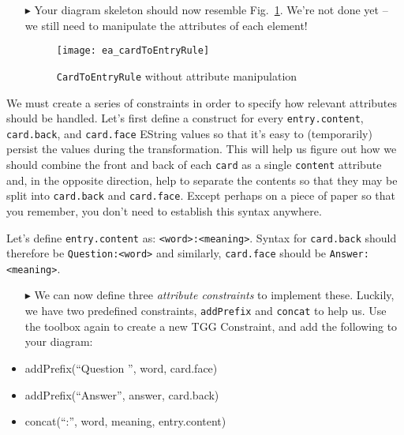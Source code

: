 \begin{enumerate}
\vspace{0.5cm}

\item[$\blacktriangleright$] Your diagram skeleton should now resemble Fig.~\ref{ea:cardtoentry_1}. We're not done yet -- we still need to manipulate the
attributes of each element!

\newpage

  \begin{figure}[htbp]
  \begin{center}
    \texttt{[image: ea\_cardToEntryRule]}
    \caption{\texttt{CardToEntryRule} without attribute manipulation}
    \label{ea:cardtoentry_1}
  \end{center}
  \end{figure}

\end{enumerate}

We must create a series of constraints in order to specify how relevant attributes should be handled. Let's first define a construct for every
\texttt{entry.content}, \texttt{card.back}, and \texttt{card.face} EString values so that it's easy to (temporarily) persist the values during the
transformation. This will help us figure out how we should combine the front and back of each \texttt{card} as a single \texttt{content} attribute and,
in the opposite direction, help to separate the contents so that they may be split into \texttt{card.back} and \texttt{card.face}. Except
perhaps on a piece of paper so that you remember, you don't need to establish this syntax anywhere. 

Let's define \texttt{entry.content} as: \texttt{<word>:<meaning>}.  Syntax for \texttt{card.back} should therefore be \texttt{Question:<word>} and
similarly, \texttt{card.face} should be \texttt{Answer:<meaning>}. 


\begin{itemize}

\item[$\blacktriangleright$] We can now define three \emph{attribute constraints} to implement these. Luckily, we have two predefined constraints, \texttt{addPrefix} and
\texttt{concat} to help us. Use the toolbox again to create a new TGG Constraint, and add the following to your diagram:

  \item addPrefix(``Question '', word, card.face)
  \item addPrefix(``Answer'', answer, card.back)
  \item concat(``:'', word, meaning, entry.content)
  
\end{itemize}

